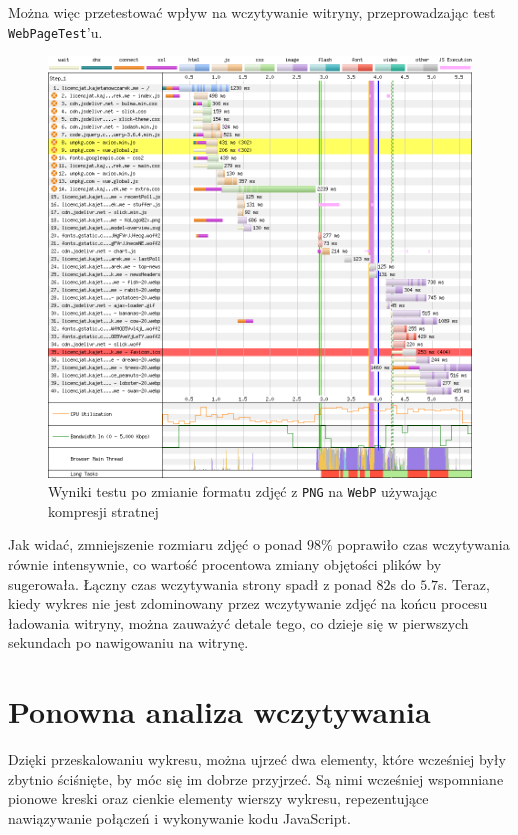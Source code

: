 \documentclass[licencjacka]{pracadypl}
\begin{document}
Można więc przetestować wpływ na wczytywanie witryny, przeprowadzając test\\ \texttt{WebPageTest}'u.

\begin{figure}[H]
  \includegraphics[width=\linewidth]{images/waterfall-after-webp.png}
  \caption{Wyniki testu po zmianie formatu zdjęć z \texttt{PNG} na \texttt{WebP} używając kompresji stratnej}
  \label{fig:waterfall-after-webp}
\end{figure}

Jak widać, zmniejszenie rozmiaru zdjęć o ponad $98\%$ poprawiło czas wczytywania równie intensywnie, co wartość procentowa zmiany objętości plików by sugerowała. Łączny czas wczytywania strony spadł z ponad $82$s do $5.7$s. Teraz, kiedy wykres nie jest zdominowany przez wczytywanie zdjęć na końcu procesu ładowania witryny, można zauważyć detale tego, co dzieje się w pierwszych sekundach po nawigowaniu na witrynę.

\section{Ponowna analiza wczytywania}
Dzięki przeskalowaniu wykresu, można ujrzeć dwa elementy, które wcześniej były zbytnio ściśnięte, by móc się im dobrze przyjrzeć. Są nimi wcześniej wspomniane pionowe kreski oraz cienkie elementy wierszy wykresu, repezentujące nawiązywanie połączeń i wykonywanie kodu JavaScript.
\end{document}
